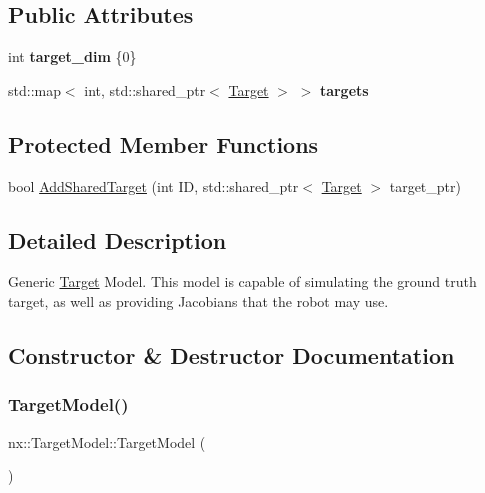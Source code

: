 \subsection*{Public Attributes}
\begin{DoxyCompactItemize}
\item 
\mbox{\label{classnx_1_1TargetModel_a103cd3cc81dd956d152ef80528188ae7}} 
int {\bfseries target\+\_\+dim} \{0\}
\item 
\mbox{\label{classnx_1_1TargetModel_a4e336259fa51d8c5b168256d86aea564}} 
std\+::map$<$ int, std\+::shared\+\_\+ptr$<$ \hyperlink{structnx_1_1Target}{Target} $>$ $>$ {\bfseries targets}
\end{DoxyCompactItemize}
\subsection*{Protected Member Functions}
\begin{DoxyCompactItemize}
\item 
bool \hyperlink{classnx_1_1TargetModel_a30aa54f7e05d026d06032279855a2b14}{Add\+Shared\+Target} (int ID, std\+::shared\+\_\+ptr$<$ \hyperlink{structnx_1_1Target}{Target} $>$ target\+\_\+ptr)
\end{DoxyCompactItemize}


\subsection{Detailed Description}
Generic \hyperlink{structnx_1_1Target}{Target} Model. This model is capable of simulating the ground truth target, as well as providing Jacobians that the robot may use. 

\subsection{Constructor \& Destructor Documentation}
\mbox{\label{classnx_1_1TargetModel_ad6df134361a815092dde948c923fee87}} 
\subsubsection{\texorpdfstring{Target\+Model()}{TargetModel()}}
{\footnotesize\ttfamily nx\+::\+Target\+Model\+::\+Target\+Model (\begin{DoxyParamCaption}{ }\end{DoxyParamCaption})\hspace{0.3cm}{\ttfamily [inline]}}

